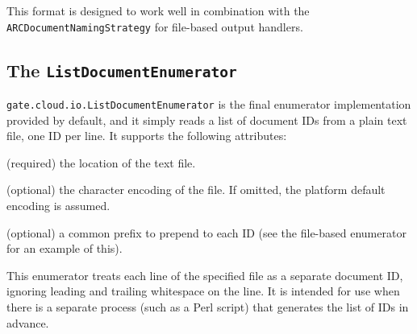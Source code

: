 This format is designed to work well in combination with the
\verb!ARCDocumentNamingStrategy!  for file-based output handlers.

\subsection{The {\tt ListDocumentEnumerator}}

\verb!gate.cloud.io.ListDocumentEnumerator! is the final enumerator
implementation provided by default, and it simply reads a list of document IDs
from a plain text file, one ID per line.  It supports the following attributes:

\bde
\item[file] (required) the location of the text file.
\item[encoding] (optional) the character encoding of the file.  If omitted, the
  platform default encoding is assumed.
\item[prefix] (optional) a common prefix to prepend to each ID (see the
  file-based enumerator for an example of this).
\ede

This enumerator treats each line of the specified file as a separate document
ID, ignoring leading and trailing whitespace on the line.  It is intended for
use when there is a separate process (such as a Perl script) that generates the
list of IDs in advance.


